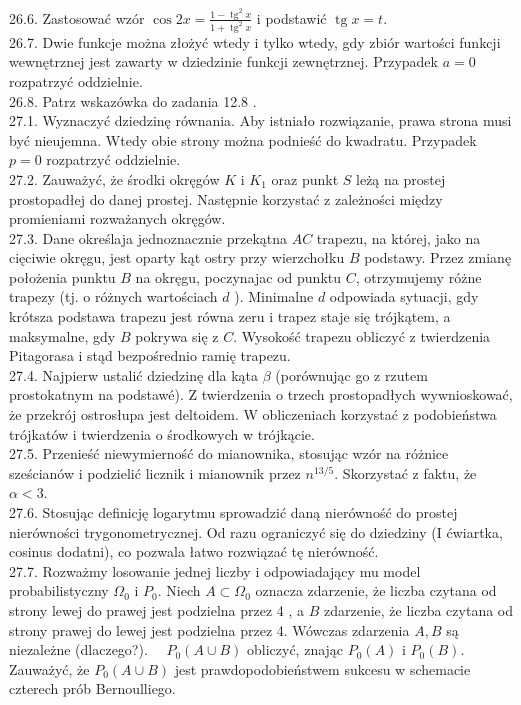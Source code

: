 \documentclass[10pt]{article}
\begin{document}
26.6. Zastosować wzór $\cos 2 x=\frac{1-\operatorname{tg}^{2} x}{1+\operatorname{tg}^{2} x}$ i podstawić $\operatorname{tg} x=t$.\\
26.7. Dwie funkcje można złożyć wtedy i tylko wtedy, gdy zbiór wartości funkcji wewnętrznej jest zawarty w dziedzinie funkcji zewnętrznej. Przypadek $a=0$ rozpatrzyć oddzielnie.\\
26.8. Patrz wskazówka do zadania 12.8 .\\
27.1. Wyznaczyć dziedzinę równania. Aby istniało rozwiązanie, prawa strona musi być nieujemna. Wtedy obie strony można podnieść do kwadratu. Przypadek $p=0$ rozpatrzyć oddzielnie.\\
27.2. Zauważyć, że środki okręgów $K$ i $K_{1}$ oraz punkt $S$ leżą na prostej prostopadłej do danej prostej. Następnie korzystać z zależności między promieniami rozważanych okręgów.\\
27.3. Dane określaja jednoznacznie przekątna $A C$ trapezu, na której, jako na cięciwie okręgu, jest oparty kąt ostry przy wierzchołku $B$ podstawy. Przez zmianę położenia punktu $B$ na okręgu, poczynajac od punktu $C$, otrzymujemy różne trapezy (tj. o różnych wartościach $d$ ). Minimalne $d$ odpowiada sytuacji, gdy krótsza podstawa trapezu jest równa zeru i trapez staje się trójkątem, a maksymalne, gdy $B$ pokrywa się z $C$. Wysokość trapezu obliczyć z twierdzenia Pitagorasa i stąd bezpośrednio ramię trapezu.\\
27.4. Najpierw ustalić dziedzinę dla kąta $\beta$ (porównując go z rzutem prostokatnym na podstawé). Z twierdzenia o trzech prostopadłych wywnioskować, że przekrój ostrosłupa jest deltoidem. W obliczeniach korzystać z podobieństwa trójkatów i twierdzenia o środkowych w trójkącie.\\
27.5. Przenieść niewymierność do mianownika, stosując wzór na różnice sześcianów i podzielić licznik i mianownik przez $n^{13 / 5}$. Skorzystać z faktu, że $\alpha<3$.\\
27.6. Stosując definicję logarytmu sprowadzić daną nierówność do prostej nierówności trygonometrycznej. Od razu ograniczyć się do dziedziny (I ćwiartka, cosinus dodatni), co pozwala łatwo rozwiązać tę nierówność.\\
27.7. Rozważmy losowanie jednej liczby i odpowiadający mu model probabilistyczny $\Omega_{0}$ i $P_{0}$. Niech $A \subset \Omega_{0}$ oznacza zdarzenie, że liczba czytana od strony lewej do prawej jest podzielna przez 4 , a $B$ zdarzenie, że liczba czytana od strony prawej do lewej jest podzielna przez 4. Wówczas zdarzenia $A, B$ są niezależne (dlaczego?). $\quad P_{0}(A \cup B)$ obliczyć, znając $P_{0}(A)$ i $P_{0}(B)$. Zauważyć, że $P_{0}(A \cup B)$ jest prawdopodobieństwem sukcesu w schemacie czterech prób Bernoulliego.\\
\end{document}
